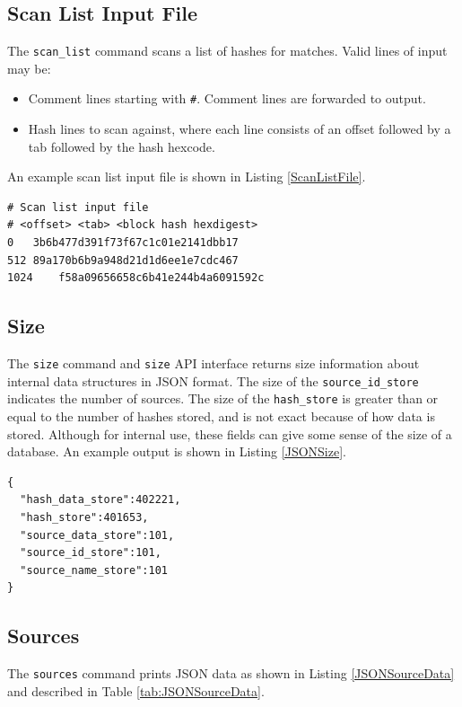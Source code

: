 \documentclass[11pt,fleqn]{article} %
\begin{document}
\subsection{Scan List Input File}
\label{ScanListInputFile}
The \verb+scan_list+ command scans a list of hashes for matches.  Valid lines of input may be:
\begin{itemize}
\item Comment lines starting with \verb+#+.  Comment lines are forwarded to output.
\item Hash lines to scan against, where each line consists of an offset followed by a tab followed by the hash hexcode.
\end{itemize}
An example scan list input file is shown in Listing \ref{ScanListFile}.\\

\lstset{style=customfile}
\begin{lstlisting}[float, caption={Example scan list input file}, label=ScanListFile]
# Scan list input file
# <offset> <tab> <block hash hexdigest>
0	3b6b477d391f73f67c1c01e2141dbb17
512	89a170b6b9a948d21d1d6ee1e7cdc467
1024	f58a09656658c6b41e244b4a6091592c
\end{lstlisting}

\subsection{Size}
The \hdb \verb+size+ command and \verb+size+ API interface returns size information about internal data structures in JSON format. The size of the \verb+source_id_store+ indicates the number of sources. The size of the \verb+hash_store+ is greater than or equal to the number of hashes stored, and is not exact because of how data is stored. Although for internal use, these fields can give some sense of the size of a \hdb database. An example output is shown in Listing \ref{JSONSize}.\\

\lstset{style=customfile}
\begin{lstlisting}[float, caption={Example JSON output of database size values}, label=JSONSize]
{
  "hash_data_store":402221,
  "hash_store":401653,
  "source_data_store":101,
  "source_id_store":101,
  "source_name_store":101
}
\end{lstlisting}

\subsection{Sources}
The \verb+sources+ command prints JSON data as shown in Listing \ref{JSONSourceData} and described in Table \ref{tab:JSONSourceData}.\\
\end{document}
